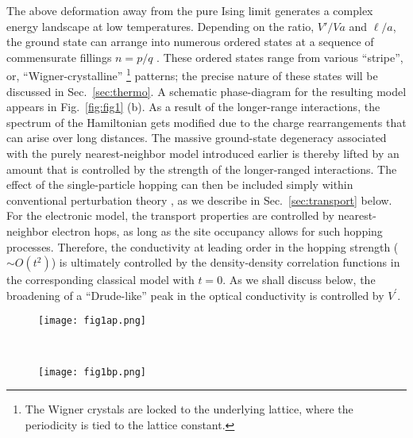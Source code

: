 \documentclass[aps,prx,onecolumn,amsmath,nofootinbib,amssymb,11pt]{revtex4-1}
\def \Hc {H_{\textnormal{int,c}}}
\begin{document}
The above deformation away from the pure Ising limit generates a complex energy landscape at low temperatures. Depending on the ratio, $V'/Va$ and $\ell/a$, the ground state can arrange into numerous ordered states at a sequence of commensurate fillings $n=p/q$ \cite{NovikovLevitov, Smerald_2016}. These ordered states range from various ``stripe'', or, ``Wigner-crystalline'' {\footnote{\textsf{The Wigner crystals are locked to the underlying lattice, where the periodicity is tied to the lattice constant.}}} patterns; the precise nature of these states will be discussed in Sec.~\ref{sec:thermo}. A schematic phase-diagram for the resulting model appears in Fig.~\ref{fig:fig1} (b). As a result of the longer-range interactions, the spectrum of the Hamiltonian gets modified due to the charge rearrangements that can arise over long distances. The massive ground-state degeneracy associated with the purely nearest-neighbor model introduced earlier is thereby lifted by an amount that is controlled by the strength of the longer-ranged interactions. The effect of the single-particle hopping can then be included simply within conventional perturbation theory \cite{Hartnoll18}, as we describe in Sec.~\ref{sec:transport} below. For the electronic model, the transport properties are controlled by nearest-neighbor electron hops, as long as the site occupancy allows for such hopping processes. Therefore, the conductivity at leading order in the hopping strength ($\sim O(t^2)$) is ultimately controlled by the density-density correlation functions in the corresponding classical model with $t=0$. As we shall discuss below, the broadening of a ``Drude-like'' peak in the optical conductivity is controlled by $V^{\prime}$.


\captionsetup[figure]{justification=centerlast}
\begin{figure*}[t!]
    \begin{subfigure}[t]{0.50\textwidth}
        \texttt{[image: fig1ap.png]}
    \end{subfigure}%
    ~ 
    \begin{subfigure}[t]{0.50\textwidth}
        \texttt{[image: fig1bp.png]}
    \end{subfigure}
    \caption{
        \textsf{(a) An illustration of the relevant interaction terms in the modified Hamiltonian, $\Hc+\delta\Hc$, for a particular configuration. Note that $\delta\Hc$ modifies the nearest-neighbour interaction term (orange line). (b) A schematic phase-diagram as a function of temperature ($T$) and filling ($0<n<1$). The nearest-neighbour (Ising) interaction drives a transition to a $\sqrt{3}\times\sqrt{3}$ charge density wave (or generalized Wigner crystal) at fillings, $n=1/3,~2/3$ below $T\sim O(V)$. For $V'\neq0$, additional correlated insulating states can appear at a sequence of commensurate fractions, $n=p/q$, at lower temperatures.}}
    \label{fig:fig1} 
\end{figure*}
\end{document}
